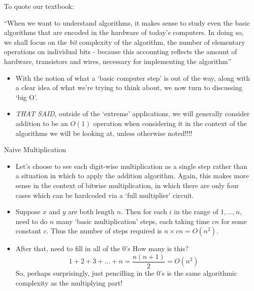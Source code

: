 \documentclass{beamer}
\begin{document}
\begin{frame}
    To quote our textbook:
    \begin{center}
         ``When we want to understand algorithms, it makes sense to study even the basic algorithms that are encoded in the hardware of today's computers. In doing so, we shall focus on the \emph{bit} complexity of the algorithm, the number of elementary operations on individual bits - because this accounting reflects the amount of hardware, transistors and wires, necessary for implementing the algorithm'' 
    \end{center}
    \begin{itemize}
        \item With the notion of what a `basic computer step' is out of the way, along with a clear idea of what we're trying to think about, we now turn to discussing `big O'. 
        \item \emph{THAT SAID}, outside of the `extreme' applications, we will generally consider addition to be an $O(1)$ operation when considering it in the context of the algorithms we will be looking at, unless otherwise noted!!!!
    \end{itemize}
\end{frame}

\begin{frame}{Naive Multiplication}
    \begin{itemize}
        \item Let's choose to see each digit-wise multiplication as a single step rather than a situation in which to apply the addition algorithm. Again, this makes more sense in the context of bitwise multiplication, in which there are only four cases which can be hardcoded via a `full multiplier' circuit.
        \pause
        \item Suppose $x$ and $y$ are both length $n$. Then for each $i$ in the range of $1, \ldots, n$, need to do $n$ many `basic multiplication' steps, each taking time $cn$ for some constant $c$. Thus the number of steps required is $n \times cn = O(n^2)$. 
        \pause
        \item After that, need to fill in all of the $0$'s How many is this? 
        \[ 1+2+3 + \ldots + n = \frac{n(n+1)}{2} = O(n^2) \]
        So, perhaps surprisingly, just pencilling in the $0$'s is the same algorithmic complexity as the multiplying part!
    \end{itemize}
\end{frame}
\end{document}
